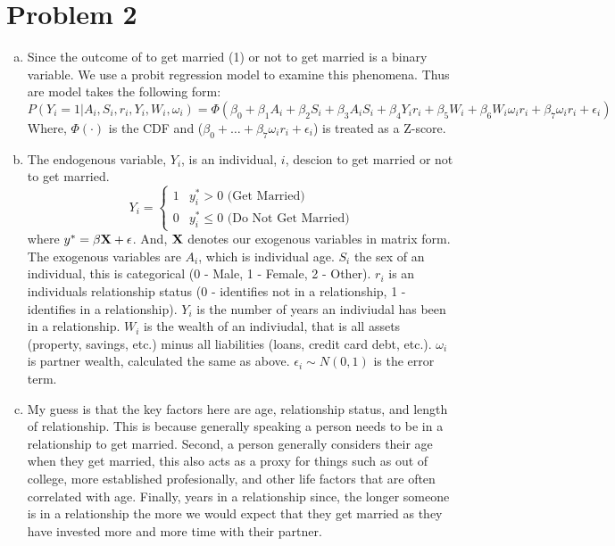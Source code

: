 \documentclass[dvips,12pt]{article}
\begin{document}
	\section*{Problem 2}
\begin{enumerate}[a.]
	\item Since the outcome of to get married (1) or not to get married is a binary variable. We use a probit regression model to examine this phenomena. Thus are model takes the following form:
	$$P(Y_i = 1 | A_i, S_i, r_i, Y_i, W_i, \omega_i) = \Phi(\beta_0 + \beta_1A_i + \beta_2S_i + \beta_3A_iS_i + \beta_4Y_ir_i + \beta_5W_i + \beta_6W_i\omega_ir_i + \beta_7\omega_ir_i + \epsilon_i)$$
	Where, $\Phi(\cdot)$ is the CDF and ($\beta_0 + \dots +\beta_7\omega_ir_i + \epsilon_i$) is treated as a Z-score.

	\item The endogenous variable, $Y_i$, is an individual, $i$, descion to get married or not to get married.
	$$Y_i = \begin{cases} 1 & y_i^* > 0 \text{ (Get Married)} \\ 0 & y_i^* \leq 0 \text{ (Do Not Get Married)} \end{cases}$$
	where $y^* = \bf{\beta}\bf{X}+\epsilon$. And, $\bf{X}$ denotes our exogenous variables in matrix form.
	\vspace{10pt}
	\\ The exogenous variables are $A_i$, which is individual age. $S_i$ the sex of an individual, this is categorical (0 - Male, 1 - Female, 2 - Other). $r_i$ is an individuals relationship status (0 - identifies not in a relationship, 1 - identifies in a relationship). $Y_i$ is the number of years an indiviudal has been in a relationship. $W_i$ is the wealth of an indiviudal, that is all assets (property, savings, etc.) minus all liabilities (loans, credit card debt, etc.). $\omega_i$ is partner wealth, calculated the same as above. $\epsilon_i \sim N(0,1)$ is the error term.

	\item My guess is that the key factors here are age, relationship status, and length of relationship. This is because generally speaking a person needs to be in a relationship to get married. Second, a person generally considers their age when they get married, this also acts as a proxy for things such as out of college, more established profesionally, and other life factors that are often correlated with age. Finally, years in a relationship since, the longer someone is in a relationship the more we would expect that they get married as they have invested more and more time with their partner. 


\end{enumerate}
\end{document}
